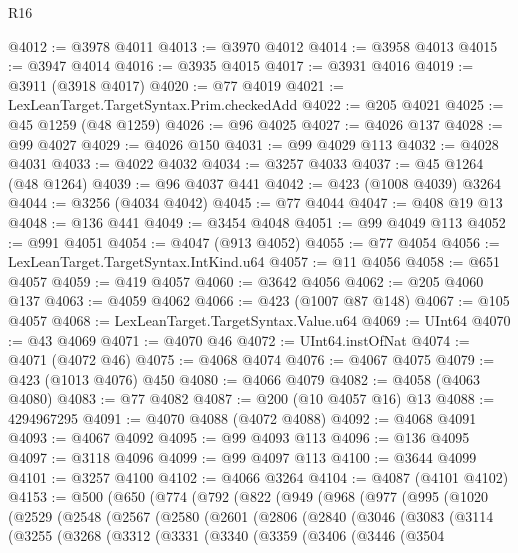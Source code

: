 \begin{lexlean}{R16}
\begin{coremodule}
@4012 := @3978 @4011
@4013 := @3970 @4012
@4014 := @3958 @4013
@4015 := @3947 @4014
@4016 := @3935 @4015
@4017 := @3931 @4016
@4019 := @3911 (@3918 @4017)
@4020 := @77 @4019
@4021 := LexLeanTarget.TargetSyntax.Prim.checkedAdd
@4022 := @205 @4021
@4025 := @45 @1259 (@48 @1259)
@4026 := @96 @4025
@4027 := @4026 @137
@4028 := @99 @4027
@4029 := @4026 @150
@4031 := @99 @4029 @113
@4032 := @4028 @4031
@4033 := @4022 @4032
@4034 := @3257 @4033
@4037 := @45 @1264 (@48 @1264)
@4039 := @96 @4037 @441
@4042 := @423 (@1008 @4039) @3264
@4044 := @3256 (@4034 @4042)
@4045 := @77 @4044
@4047 := @408 @19 @13
@4048 := @136 @441
@4049 := @3454 @4048
@4051 := @99 @4049 @113
@4052 := @991 @4051
@4054 := @4047 (@913 @4052)
@4055 := @77 @4054
@4056 := LexLeanTarget.TargetSyntax.IntKind.u64
@4057 := @11 @4056
@4058 := @651 @4057
@4059 := @419 @4057
@4060 := @3642 @4056
@4062 := @205 @4060 @137
@4063 := @4059 @4062
@4066 := @423 (@1007 @87 @148)
@4067 := @105 @4057
@4068 := LexLeanTarget.TargetSyntax.Value.u64
@4069 := UInt64
@4070 := @43 @4069
@4071 := @4070 @46
@4072 := UInt64.instOfNat
@4074 := @4071 (@4072 @46)
@4075 := @4068 @4074
@4076 := @4067 @4075
@4079 := @423 (@1013 @4076) @450
@4080 := @4066 @4079
@4082 := @4058 (@4063 @4080)
@4083 := @77 @4082
@4087 := @200 (@10 @4057 @16) @13
@4088 := 4294967295
@4091 := @4070 @4088 (@4072 @4088)
@4092 := @4068 @4091
@4093 := @4067 @4092
@4095 := @99 @4093 @113
@4096 := @136 @4095
@4097 := @3118 @4096
@4099 := @99 @4097 @113
@4100 := @3644 @4099
@4101 := @3257 @4100
@4102 := @4066 @3264
@4104 := @4087 (@4101 @4102)
@4153 := @500
    (@650
      (@774
        (@792
          (@822
            (@949
              (@968
                (@977
                  (@995
                    (@1020
                      (@2529
                        (@2548
                          (@2567
                            (@2580
                              (@2601
                                (@2806
                                  (@2840
                                    (@3046
                                      (@3083
                                        (@3114
                                          (@3255
                                            (@3268
                                              (@3312
                                                (@3331
                                                  (@3340
                                                    (@3359
                                                      (@3406
                                                        (@3446
                                                          (@3504

\end{coremodule}
\end{lexlean}
